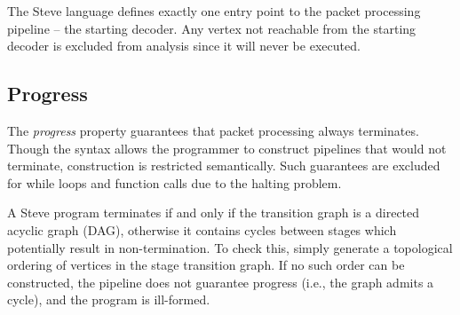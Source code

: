 %
%

The Steve language defines exactly one entry point to the packet processing pipeline -- the starting decoder. Any vertex not reachable from the starting decoder is excluded from analysis since it will never be executed.

\subsection{Progress} \label{guide:progress}

The \textit{progress} property guarantees that packet processing always terminates. Though the syntax allows the programmer to construct pipelines that would not terminate, construction is restricted semantically.  Such guarantees are excluded for while loops and function calls due to the halting problem.

A Steve program terminates if and only if the transition graph is a directed acyclic graph (DAG), otherwise it contains cycles between stages which potentially result in non-termination.
To check this, simply generate a topological ordering of vertices in the stage transition graph. If no such order can be constructed, the pipeline does not guarantee progress (i.e., the graph admits a cycle), and the program is ill-formed.

